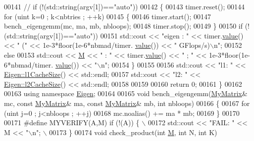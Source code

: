 \begin{DoxyCode}
{{{00141 \textcolor{comment}{//   if (!(std::string(argv[1])=="auto"))}
00142   \{
00143       timer.reset();
00144       \textcolor{keywordflow}{for} (uint k=0 ; k<nbtries ; ++k)
00145       \{
00146           timer.start();
00147           bench\_eigengemm(mc, ma, mb, nbloops);
00148           timer.stop();
00149       \}
00150       \textcolor{keywordflow}{if} (!(std::string(argv[1])==\textcolor{stringliteral}{"auto"}))
00151         std::cout << \textcolor{stringliteral}{"eigen : "} << timer.\hyperlink{class_eigen_1_1_bench_timer_a26760f963ed8b64c126159bfea57735e}{value}() << \textcolor{stringliteral}{" ("} << 1e-3*floor(1e-6*nbmad/timer.
      \hyperlink{class_eigen_1_1_bench_timer_a26760f963ed8b64c126159bfea57735e}{value}()) << \textcolor{stringliteral}{" GFlops/s)\(\backslash\)n"};
00152       \textcolor{keywordflow}{else}
00153         std::cout << \hyperlink{group___core___module_class_eigen_1_1_matrix}{M} << \textcolor{stringliteral}{" : "} << timer.\hyperlink{class_eigen_1_1_bench_timer_a26760f963ed8b64c126159bfea57735e}{value}() << \textcolor{stringliteral}{" ; "} << 1e-3*floor(1e-6*nbmad/timer.
      \hyperlink{class_eigen_1_1_bench_timer_a26760f963ed8b64c126159bfea57735e}{value}()) << \textcolor{stringliteral}{"\(\backslash\)n"};
00154   \}
00155 
00156   std::cout << \textcolor{stringliteral}{"l1: "} << \hyperlink{namespace_eigen_a2669f89ff38296a38e6d973552eb4e33}{Eigen::l1CacheSize}() << std::endl;
00157   std::cout << \textcolor{stringliteral}{"l2: "} << \hyperlink{namespace_eigen_a2cfc0330ba567d63a496be1cac8427ae}{Eigen::l2CacheSize}() << std::endl;
00158   
00159 
00160   \textcolor{keywordflow}{return} 0;
00161 \}
00162 
00163 \textcolor{keyword}{using namespace }\hyperlink{namespace_eigen}{Eigen};
00164 
00165 \textcolor{keywordtype}{void} bench\_eigengemm(\hyperlink{group___core___module_class_eigen_1_1_matrix}{MyMatrix}& mc, \textcolor{keyword}{const} \hyperlink{group___core___module_class_eigen_1_1_matrix}{MyMatrix}& ma, \textcolor{keyword}{const} 
      \hyperlink{group___core___module_class_eigen_1_1_matrix}{MyMatrix}& mb, \textcolor{keywordtype}{int} nbloops)
00166 \{
00167   \textcolor{keywordflow}{for} (uint j=0 ; j<nbloops ; ++j)
00168       mc.noalias() += ma * mb;
00169 \}
00170 
00171 \textcolor{preprocessor}{#define MYVERIFY(A,M) if (!(A)) \{ \(\backslash\)}
00172 \textcolor{preprocessor}{    std::cout << "FAIL: " << M << "\(\backslash\)n"; \(\backslash\)}
00173 \textcolor{preprocessor}{  \}}
00174 \textcolor{keywordtype}{void} check\_product(\textcolor{keywordtype}{int} \hyperlink{group___core___module_class_eigen_1_1_matrix}{M}, \textcolor{keywordtype}{int} N, \textcolor{keywordtype}{int} K)
}}}
\end{DoxyCode}
